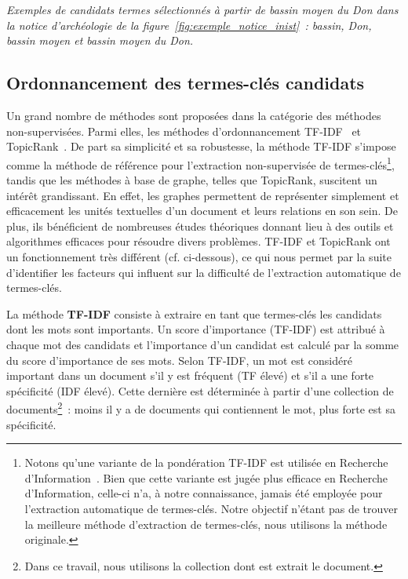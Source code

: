     \textit{Exemples de candidats termes sélectionnés à partir de \og{}bassin
    moyen du Don\fg{} dans la notice d'archéologie de la
    figure~\ref{fig:exemple_notice_inist}~: \og{}bassin\fg{}, \og{}Don\fg{},
    \og{}bassin moyen\fg{} et \og{}bassin moyen du Don\fg{}.}

  \subsection{Ordonnancement des termes-clés candidats}
  \label{subsec:extraction_de_termes_cles}
    Un grand nombre de méthodes sont proposées dans la catégorie des méthodes
    non-supervisées. Parmi elles, les méthodes d'ordonnancement
    TF-IDF~\cite{jones1972tfidf} et TopicRank~\cite{bougouin2013topicrank}. De
    part sa simplicité et sa robustesse, la méthode TF-IDF s'impose comme la
    méthode de référence pour l'extraction non-supervisée de
    termes-clés\footnote{Notons qu'une variante de la pondération TF-IDF est
    utilisée en Recherche
    d'Information~\cite[Okapi]{robertson1999okapi,claveau2012vectorisation}.
    Bien que cette variante est jugée plus efficace en Recherche d'Information,
    celle-ci n'a, à notre connaissance, jamais été employée pour l'extraction
    automatique de termes-clés. Notre objectif n'étant pas de trouver la
    meilleure méthode d'extraction de termes-clés, nous utilisons la méthode
    originale.}, tandis que les méthodes à base de graphe, telles que TopicRank,
    suscitent un intérêt grandissant. En effet, les graphes permettent de
    représenter simplement et efficacement les unités textuelles d'un document
    et leurs relations en son sein. De plus, ils bénéficient de nombreuses
    études théoriques donnant lieu à des outils et algorithmes efficaces pour
    résoudre divers problèmes. TF-IDF et TopicRank ont un fonctionnement très
    différent (cf. ci-dessous), ce qui nous permet par la suite d'identifier les
    facteurs qui influent sur la difficulté de l'extraction automatique de
    termes-clés.

    La méthode \textbf{TF-IDF} consiste à extraire en tant que termes-clés les
    candidats dont les mots sont importants. Un score d'importance (TF-IDF) est
    attribué à chaque mot des candidats et l'importance d'un candidat est
    calculé par la somme du score d'importance de ses mots. Selon TF-IDF, un mot
    est considéré important dans un document s'il y est fréquent (TF élevé) et
    s'il a une forte spécificité (IDF élevé). Cette dernière est déterminée à
    partir d'une collection de documents\footnote{Dans ce travail, nous
    utilisons la collection dont est extrait le document.}~: moins il y a de
    documents qui contiennent le mot, plus forte est sa spécificité.

